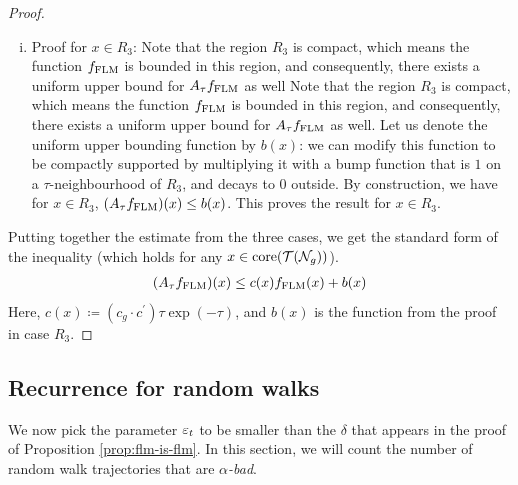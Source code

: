 \documentclass[12pt, reqno]{amsart}
\begin{document}
\begin{proof}
\begin{enumerate}[(i)]
    Furthermore, since $z_{i, \mathrm{im}}$ is constant along balls in $\mathbb{H}_j$ for $j \neq i$, it suffices to average just each term of the sum in the corresponding $\mathbb{H}_i$.
    We do so, using the same estimate from the proof in the $R_1$ case.
    \begin{align*}
      (A_{\tau}\flm^{\prime})(x) \leq c^{\prime} \tau \exp(-\tau) \flm^{\prime}(x)
    \end{align*}
    Replacing $\flm^{\prime}$ with $\flm$ gives us the inequality we want, and proves the result in this case.
    \begin{align*}
      (A_{\tau}\flm)(x) \leq  (c_g \cdot c^{\prime}) \tau \exp(-\tau) \flm(x)
    \end{align*}
  \item Proof for $x \in R_3$: Note that the region $R_3$ is compact, which means the function $\flm$ is bounded in this region, and consequently, there exists a uniform upper bound for $A_\tau f_{\mathrm{FLM}}$ as well Note that the region $R_3$ is compact, which means the function $\flm$ is bounded in this region, and consequently, there exists a uniform upper bound for $A_\tau f_{\mathrm{FLM}}$ as well.
    Let us denote the uniform upper bounding function by $b(x)$: we can modify this function to be compactly supported by multiplying it with a bump function that is $1$ on a $\tau$-neighbourhood of $R_3$, and decays to $0$ outside.
    By construction, we have for $x \in R_3$, $(A_{\tau}f_{\mathrm{FLM}})(x) \leq b(x)$.
    This proves the result for $x \in R_3$.
  \end{enumerate}
  Putting together the estimate from the three cases, we get the standard form of the inequality (which holds for any $x \in \mathrm{core}(\mathcal{T}(\mathcal{N}_g))$).
  \begin{align*}
    (A_{\tau} f_{\mathrm{FLM}})(x) \leq c(x) f_{\mathrm{FLM}}(x) + b(x)
  \end{align*}
  Here, $c(x) \coloneqq (c_g \cdot c^{\prime}) \tau \exp(-\tau)$, and $b(x)$ is the function from the proof in case $R_3$.
\end{proof}

\subsection{Recurrence for random walks}
\label{sec:recurr-rand-walks-1}

We now pick the parameter $\varepsilon_t$ to be smaller than the $\delta$ that appears in the proof of Proposition \ref{prop:flm-is-flm}.
In this section, we will count the number of random walk trajectories that are \emph{$\alpha$-bad}.
\end{document}
